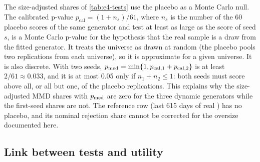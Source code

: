 The size-adjusted shares of \cref{tab:e4-tests} use the placebo as a Monte Carlo null. The
calibrated p-value $p_{\mathrm{cal}}=(1+n_s)/61$, where $n_s$ is the number of the 60 placebo
scores of the same generator and test at least as large as the score of seed $s$, is a Monte
Carlo p-value for the hypothesis that the real \TEST{} sample is a draw from the fitted
generator. It treats the universe as drawn at random (the placebo pools two replications from
each universe), so it is approximate for a given universe. It is also discrete. With two seeds,
$p_{\mathrm{med}}=\min\{1,p_{\mathrm{cal},1}+p_{\mathrm{cal},2}\}$ is at least $2/61\approx0.033$, and it is at
most 0.05 only if $n_1+n_2\le1$: both seeds must score above all, or all but one, of the placebo
replications. This explains why the size-adjusted MMD shares with $p_{\mathrm{med}}$ are zero for the three
dynamic generators while the first-seed shares are not. The reference row (last 615 days of real
\TRAIN{}) has no placebo, and its nominal rejection share cannot be corrected for the oversize
documented here.

\subsection{Link between tests and utility}\label{app:mk-link}

\begin{table}[p]
  \centering
\end{table}

\begin{table}[p]
  \centering
\end{table}

